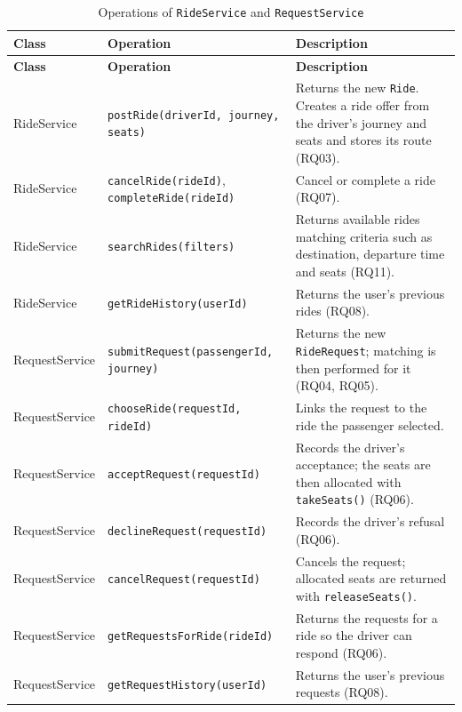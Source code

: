 {\begin{longtable}{@{}>{\raggedright\arraybackslash}p{}
                   >{\raggedright\arraybackslash}p{}
                   >{\raggedright\arraybackslash}p{}@{}}
\caption{Operations of \texttt{RideService} and \texttt{RequestService}}\label{tab:serviceops}\\
\toprule
\textbf{Class} & \textbf{Operation} & \textbf{Description} \\
\midrule
\endfirsthead
\toprule
\textbf{Class} & \textbf{Operation} & \textbf{Description} \\
\midrule
\endhead
\bottomrule
\endfoot
RideService & \texttt{postRide(driverId, journey, seats)} & Returns the new \texttt{Ride}. Creates a ride offer from the driver's journey and seats and stores its route (RQ03). \\
RideService & \texttt{cancelRide(rideId)}, \texttt{completeRide(rideId)} & Cancel or complete a ride (RQ07). \\
RideService & \texttt{searchRides(filters)} & Returns available rides matching criteria such as destination, departure time and seats (RQ11). \\
RideService & \texttt{getRideHistory(userId)} & Returns the user's previous rides (RQ08). \\
RequestService & \texttt{submitRequest(passengerId, journey)} & Returns the new \texttt{RideRequest}; matching is then performed for it (RQ04, RQ05). \\
RequestService & \texttt{chooseRide(requestId, rideId)} & Links the request to the ride the passenger selected. \\
RequestService & \texttt{acceptRequest(requestId)} & Records the driver's acceptance; the seats are then allocated with \texttt{takeSeats()} (RQ06). \\
RequestService & \texttt{declineRequest(requestId)} & Records the driver's refusal (RQ06). \\
RequestService & \texttt{cancelRequest(requestId)} & Cancels the request; allocated seats are returned with \texttt{releaseSeats()}. \\
RequestService & \texttt{getRequestsForRide(rideId)} & Returns the requests for a ride so the driver can respond (RQ06). \\
RequestService & \texttt{getRequestHistory(userId)} & Returns the user's previous requests (RQ08). \\
\end{longtable}

}
